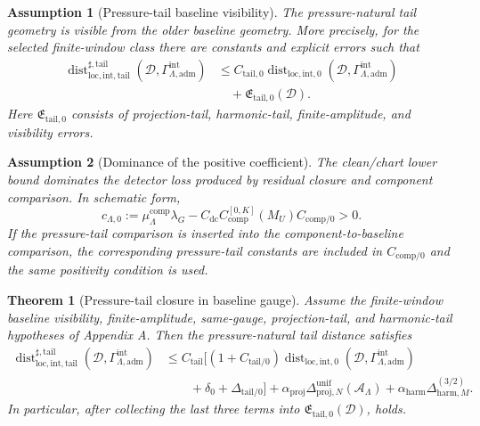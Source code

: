 \documentclass[10pt,a4paper]{amsart}
\newtheorem{assumption}{Assumption}
\newtheorem{theorem}{Theorem}
\newcommand{\Dist}{\operatorname{dist}}
\newcommand{\adm}{\mathrm{adm}}
\newcommand{\calA}{\mathcal A}
\newcommand{\calD}{\mathcal D}
\newcommand{\comp}{\mathrm{comp}}
\newcommand{\harm}{\mathrm{harm}}
\newcommand{\intg}{\mathrm{int}}
\newcommand{\loc}{\mathrm{loc}}
\newcommand{\proj}{\mathrm{proj}}
\newcommand{\tail}{\mathrm{tail}}
\begin{document}
\begin{assumption}[Pressure-tail baseline visibility]\label{ass:main-pressure-tail-visibility}
The pressure-natural tail geometry is visible from the older baseline geometry.  More precisely, for the selected finite-window class there are constants and explicit errors such that
\begin{equation}\label{eq:ass-pressure-tail-visibility}
\begin{aligned}
\Dist^{\sharp,\tail}_{\loc,\intg,\tail}
(\calD,\Gamma^{\intg}_{\Lambda,\adm})
&\le
C_{\tail,0}
\Dist_{\loc,\intg,0}
(\calD,\Gamma^{\intg}_{\Lambda,\adm})\\
&\quad
+
\mathfrak E_{\tail,0}(\calD).
\end{aligned}
\end{equation}
Here \(\mathfrak E_{\tail,0}\) consists of projection-tail, harmonic-tail, finite-amplitude, and visibility errors.
\end{assumption}

\begin{assumption}[Dominance of the positive coefficient]\label{ass:main-positive-coefficient}
The clean/chart lower bound dominates the detector loss produced by residual closure and component comparison.  In schematic form,
\begin{equation}\label{eq:ass-positive-coeff}
        c_{\Lambda,0}
        :=
        \mu_\Lambda^{\comp}\lambda_G
        -
        C_{\mathrm{dc}}
        C_{\comp}^{[0,K]}(M_U)
        C_{\comp/0}
        >0.
\end{equation}
If the pressure-tail comparison is inserted into the component-to-baseline comparison, the corresponding pressure-tail constants are included in \(C_{\comp/0}\) and the same positivity condition is used.
\end{assumption}

\begin{theorem}[Pressure-tail closure in baseline gauge]\label{thm:main-pressure-tail-module}
Assume the finite-window baseline visibility, finite-amplitude, same-gauge, projection-tail, and harmonic-tail hypotheses of Appendix A.  Then the pressure-natural tail distance satisfies
\begin{equation}\label{eq:main-pressure-tail-module}
\begin{aligned}
\Dist^{\sharp,\tail}_{\loc,\intg,\tail}
(\calD,\Gamma^{\intg}_{\Lambda,\adm})
&\le
C_{\tail}
\bigl[
(1+C_{\tail/0})
\Dist_{\loc,\intg,0}
(\calD,\Gamma^{\intg}_{\Lambda,\adm})\\
&\qquad
+\delta_0+
\Delta_{\tail/0}
\bigr]
+
\alpha_{\proj}\Delta^{\mathrm{unif}}_{\proj,N}(\calA_\Lambda)
+
\alpha_{\harm}\Delta^{(3/2)}_{\harm,M}.
\end{aligned}
\end{equation}
In particular, after collecting the last three terms into \(\mathfrak E_{\tail,0}(\calD)\),  holds.
\end{theorem}
\end{document}
